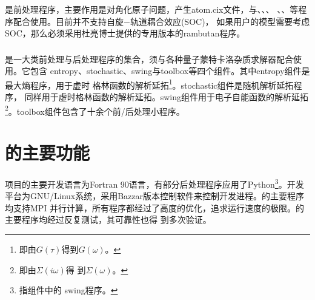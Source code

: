 \subsubsection{{\jasmine}}
{\jasmine}是前处理程序，主要作用是对角化原子问题，产生atom.cix文件，与{\begonia}、{\lavender}、{\camellia}、
{\epiphyllum}、{\pansy}、{\manjushaka}等程序配合使用。目前{\jasmine}并不支持自旋$-$轨道耦合效应(SOC)，
如果用户的模型需要考虑SOC，那么必须采用杜亮博士提供的专用版本的rambutan程序。

\subsubsection{{\hibiscus}}
{\hibiscus}是一大类前处理与后处理程序的集合，须与各种量子蒙特卡洛杂质求解器配合使用。它包含
entropy、stochastic、swing与toolbox等四个组件。其中entropy组件是最大熵程序\cite{jarrell:133}，用于虚时
格林函数的解析延拓\footnote{即由$G(\tau)$得到$G(\omega)$。}。stochastic组件是随机解析延拓程序\cite{beach}，
同样用于虚时格林函数的解析延拓。swing组件用于电子自能函数的解析延拓\footnote{即由$\Sigma(i\omega)$得
到$\Sigma(\omega)$。}。toolbox组件包含了十余个前/后处理小程序。

\section{{\iqist}的主要功能}
\label{sec:function}

{\iqist}项目的主要开发语言为Fortran 90语言，有部分后处理程序应用了Python\footnote{指{\hibiscus}组件中的
swing程序。}。开发平台为GNU/Linux系统，采用Bazzar版本控制软件来控制开发进程。{\iqist}的主要程序均支持MPI
并行计算，所有程序都经过了高度的优化，追求运行速度的极限。{\iqist}的主要程序均经过反复测试，其可靠性也得
到多次验证。

